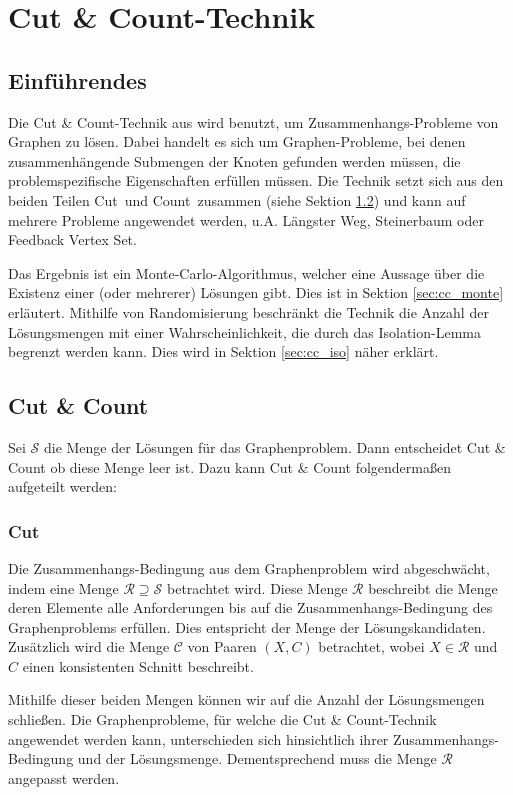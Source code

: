\section{Cut \& Count-Technik}
\label{c:cc_general}

\subsection{Einführendes}
\label{sec:cc_intro}
Die Cut \& Count-Technik aus \cite{cygan_solving_2011} wird benutzt, um Zusammenhangs-Probleme von Graphen zu lösen.
Dabei handelt es sich um Graphen-Probleme, bei denen zusammenhängende Submengen der Knoten gefunden werden müssen, die problemspezifische  Eigenschaften erfüllen müssen. 
Die Technik setzt sich aus den beiden Teilen \glqq Cut\grqq ~und \glqq Count\grqq ~zusammen (siehe Sektion \ref{sec:cc_cc}) und kann auf mehrere Probleme angewendet werden, u.A. Längster Weg, Steinerbaum oder Feedback Vertex Set.

Das Ergebnis ist ein Monte-Carlo-Algorithmus, welcher eine Aussage über die Existenz einer (oder mehrerer) Lösungen gibt. Dies ist in Sektion \ref{sec:cc_monte} erläutert.
Mithilfe von Randomisierung beschränkt die Technik die Anzahl der Lösungsmengen mit einer Wahrscheinlichkeit, die durch das Isolation-Lemma begrenzt werden kann. Dies wird in Sektion \ref{sec:cc_iso} näher erklärt.


\subsection{Cut \& Count}
\label{sec:cc_cc}
Sei $\mathcal{S}$ die Menge der Lösungen für das Graphenproblem. 
Dann entscheidet Cut \& Count ob diese Menge leer ist. 
Dazu kann Cut \& Count folgendermaßen aufgeteilt werden:

\subsubsection{Cut}
\label{ssec:cc_cut}
Die Zusammenhangs-Bedingung aus dem Graphenproblem wird abgeschwächt, indem eine Menge $\mathcal{R} \supseteq \mathcal{S}$ betrachtet wird. 
Diese Menge $\mathcal{R}$ beschreibt die Menge deren Elemente alle Anforderungen bis auf die Zusammenhangs-Bedingung des Graphenproblems erfüllen. Dies entspricht der Menge der Lösungskandidaten.
Zusätzlich wird die Menge $\mathcal{C}$ von Paaren $(X,C)$ betrachtet, wobei $X \in \mathcal{R}$ und $C$ einen konsistenten Schnitt beschreibt. 

Mithilfe dieser beiden Mengen können wir auf die Anzahl der Lösungsmengen schließen. Die Graphenprobleme, für welche die Cut \& Count-Technik angewendet werden kann, unterschieden sich hinsichtlich ihrer Zusammenhangs-Bedingung und der Lösungsmenge.
Dementsprechend muss die Menge $\mathcal{R}$ angepasst werden.
